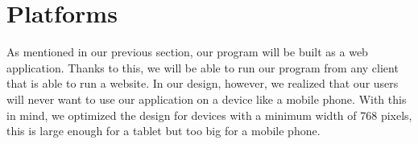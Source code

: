\section{Platforms}
As mentioned in our previous section, our program will be built as a web application. Thanks to this, we will be able to run our program from any client that is able to run a website. In our design, however, we realized that our users will never want to use our application on a device like a mobile phone. With this in mind, we optimized the design for devices with a minimum width of 768 pixels, this is large enough for a tablet but too big for a mobile phone. 
